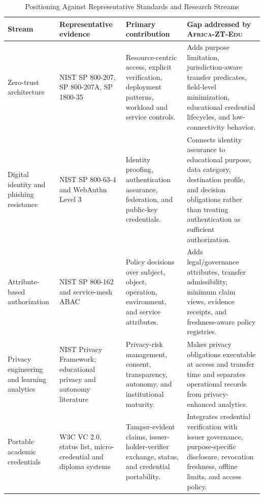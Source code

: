 \documentclass[journal]{IEEEtran}
\newcommand{\THead}[1]{\cellcolor{TableHeader}\textbf{#1}}
\newcommand{\system}{\textsc{Africa-ZT-Edu}\xspace}
\begin{document}
\begin{table}[t]
\caption{Positioning Against Representative Standards and Research Streams}
\label{tab:related}
\centering
\scriptsize
\begin{tabularx}{\textwidth}{|p{}|p{}|p{}|p{}|}
\hline
\THead{Stream} & \THead{Representative evidence} & \THead{Primary contribution} & \THead{Gap addressed by \system} \\
\hline
Zero-trust architecture & NIST SP 800-207, SP 800-207A, SP 1800-35 \cite{nist800207,nist800207a,NIST180035_2025} & Resource-centric access, explicit verification, deployment patterns, workload and service controls. & Adds purpose limitation, jurisdiction-aware transfer predicates, field-level minimization, educational credential lifecycles, and low-connectivity behavior. \\
\hline
Digital identity and phishing resistance & NIST SP 800-63-4 and WebAuthn Level 3 \cite{Temoshok2025Identity,W3CWebAuthn2026} & Identity proofing, authentication assurance, federation, and public-key credentials. & Connects identity assurance to educational purpose, data category, destination profile, and decision obligations rather than treating authentication as sufficient authorization. \\
\hline
Attribute-based authorization & NIST SP 800-162 and service-mesh ABAC \cite{Hu2019ABAC,nist800204b} & Policy decisions over subject, object, operation, environment, and service attributes. & Adds legal/governance attributes, transfer admissibility, minimum claim views, evidence receipts, and freshness-aware policy registries. \\
\hline
Privacy engineering and learning analytics & NIST Privacy Framework; educational privacy and autonomy literature \cite{nistprivacy,nist8062,hoelchen2018,jones2019,simic2025} & Privacy-risk management, consent, transparency, autonomy, and institutional maturity. & Makes privacy obligations executable at access and transfer time and separates operational records from privacy-enhanced analytics. \\
\hline
Portable academic credentials & W3C VC 2.0, status list, micro-credential and diploma systems \cite{w3cvc20,w3cstatus,ahsan2023,rustemi2024,wang2025} & Tamper-evident claims, issuer-holder-verifier exchange, status, and credential portability. & Integrates credential verification with issuer governance, purpose-specific disclosure, revocation freshness, offline limits, and access policy. \\

\end{tabularx}
\end{table}
\end{document}
